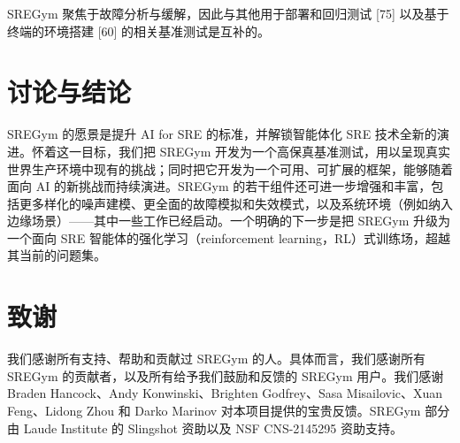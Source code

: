 \documentclass[11pt,UTF8,fontset=fandol]{ctexart}
\begin{document}
SREGym 聚焦于故障分析与缓解，因此与其他用于部署和回归测试 [75] 以及基于终端的环境搭建 [60] 的相关基准测试是互补的。

\section{讨论与结论}

SREGym 的愿景是提升 AI for SRE 的标准，并解锁智能体化 SRE 技术全新的演进。怀着这一目标，我们把 SREGym 开发为一个高保真基准测试，用以呈现真实世界生产环境中现有的挑战；同时把它开发为一个可用、可扩展的框架，能够随着面向 AI 的新挑战而持续演进。SREGym 的若干组件还可进一步增强和丰富，包括更多样化的噪声建模、更全面的故障模拟和失效模式，以及系统环境（例如纳入边缘场景）——其中一些工作已经启动。一个明确的下一步是把 SREGym 升级为一个面向 SRE 智能体的强化学习（reinforcement learning，RL）式训练场，超越其当前的问题集。

\section*{致谢}

我们感谢所有支持、帮助和贡献过 SREGym 的人。具体而言，我们感谢所有 SREGym 的贡献者，以及所有给予我们鼓励和反馈的 SREGym 用户。我们感谢 Braden Hancock、Andy Konwinski、Brighten Godfrey、Sasa Misailovic、Xuan Feng、Lidong Zhou 和 Darko Marinov 对本项目提供的宝贵反馈。SREGym 部分由 Laude Institute 的 Slingshot 资助以及 NSF CNS-2145295 资助支持。
\end{document}

